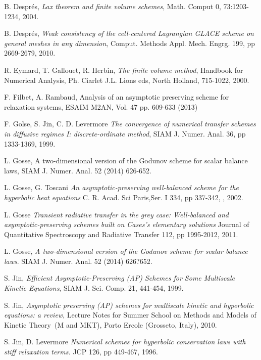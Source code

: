 \documentclass[a4paper,french,english,10pt]{article}
\begin{document}
{\begin{thebibliography}{abcde}
 B. Despr\'es,  \emph{Lax theorem and finite volume
schemes},
Math. Comput 0, 73:1203-1234, 2004.

 B. Despr\'es,  \emph{Weak consistency of the cell-centered
Lagrangian GLACE scheme on general
meshes in any dimension}, Comput. Methods Appl. Mech. Engrg. 199, pp 
2669-2679, 2010.

 R. Eymard, T. Gallouet, R. Herbin, \emph{The finite volume
method}, Handbook for Numerical Analysis, Ph. Ciarlet J.L. Lions eds, North
Holland, 715-1022, 2000.


  F. Filbet, A. Rambaud, Analysis of an asymptotic preserving scheme for relaxation
systems, ESAIM M2AN, Vol. 47 pp. 609-633 (2013)

 F. Golse, S. Jin, C. D. Levermore \emph{The convergence
of numerical transfer schemes in diffusive regimes I: discrete-ordinate method},
SIAM J. Numer. Anal. 36, pp 1333-1369, 1999.

L. Gosse, 
A two-dimensional version of the Godunov scheme for scalar balance laws,
 SIAM J. Numer. Anal. 52 (2014) 626-652.

 L. Gosse, G. Toscani \emph{An asymptotic-preserving
well-balanced scheme for the hyperbolic heat equations} C. R. Acad. Sci
Paris,Ser. I 334, pp  337-342, , 2002.

 L. Gosse \emph{Transient radiative transfer in the grey
case: Well-balanced and asymptotic-preserving schemes built on Cases's
elementary solutions} Journal of Quantitative Spectroscopy and Radiative
Transfer 112, pp 1995-2012, 2011.

  L. Gosse, \emph{A two-dimensional version of the Godunov scheme for scalar balance laws}. SIAM J. Numer. Anal. 52 (2014) 626?652.

 S. Jin, \emph{Efficient Asymptotic-Preserving (AP)
Schemes for Some Multiscale Kinetic Equations},  SIAM J. Sci. Comp. 21, 441-454,
1999.

 S. Jin, \emph{Asymptotic preserving (AP) schemes for
multiscale kinetic and hyperbolic equations: a review}, Lecture Notes for Summer
School on \og Methods and Models of Kinetic Theory\fg\, (M and MKT), Porto
Ercole (Grosseto, Italy),  2010.

 S. Jin, D. Levermore \emph{Numerical schemes for
hyperbolic conservation laws with stiff relaxation terms.} JCP 126, pp 449-467,
1996.


\end{thebibliography}}
\end{document}
